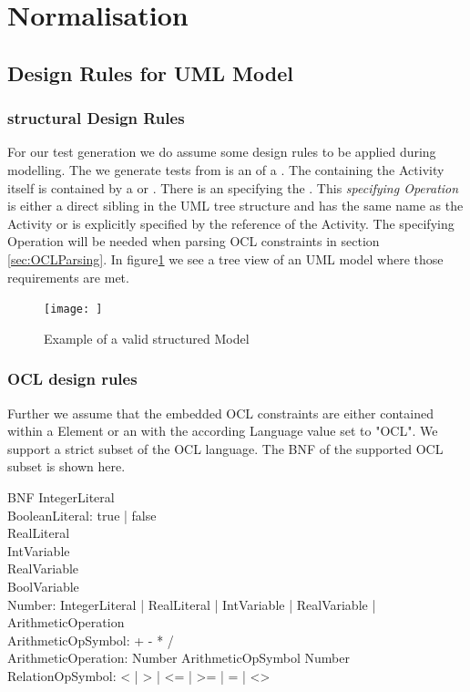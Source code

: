 \section{Normalisation}

\subsection{Design Rules for UML Model} %
\subsubsection{structural Design Rules}
For our test generation we do assume some design rules to be applied during modelling. The  we generate tests from is an  of a . The   containing the Activity itself is contained by a  or . 
There is an  specifying the . This \emph{specifying Operation} is either a direct sibling in the UML tree structure and has the same name as the Activity or is explicitly specified by the  reference of the Activity. The specifying Operation will be needed when parsing OCL constraints in section \ref{sec:OCLParsing}.
In figure\ref{fig:StructureExample} we see a tree view of an UML model where those requirements are met.
\begin{figure}
\label{fig:StructureExample}
\texttt{[image: ]}
\caption{Example of a valid structured Model}
\end{figure}
\subsubsection{OCL design rules}
Further we assume that the embedded OCL constraints are either contained within a  Element or an  with the according Language value set to "OCL". We support a strict subset of the OCL language. The BNF of the supported OCL subset is shown here.

BNF
IntegerLiteral\\
BooleanLiteral: true | false\\
RealLiteral\\
IntVariable\\
RealVariable\\
BoolVariable\\
Number: IntegerLiteral | RealLiteral | IntVariable | RealVariable | ArithmeticOperation\\
ArithmeticOpSymbol: + - * /\\
ArithmeticOperation: Number ArithmeticOpSymbol Number \\
RelationOpSymbol: < | > | <= | >= | = | <> 

